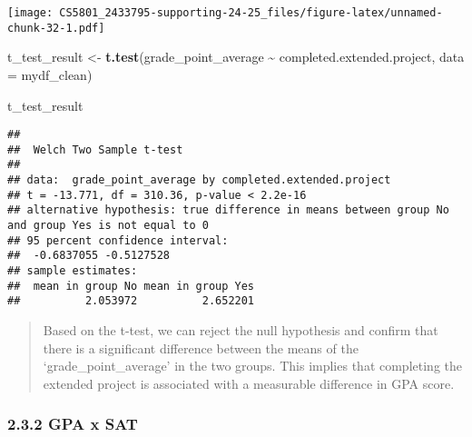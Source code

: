\documentclass[
]{article}
\newenvironment{Shaded}{\begin{snugshade}}{\end{snugshade}}
\newcommand{\AttributeTok}[1]{\textcolor[rgb]{0.13,0.29,0.53}{#1}}
\newcommand{\CommentTok}[1]{\textcolor[rgb]{0.56,0.35,0.01}{\textit{#1}}}
\newcommand{\DecValTok}[1]{\textcolor[rgb]{0.00,0.00,0.81}{#1}}
\newcommand{\FunctionTok}[1]{\textcolor[rgb]{0.13,0.29,0.53}{\textbf{#1}}}
\newcommand{\NormalTok}[1]{#1}
\newcommand{\OtherTok}[1]{\textcolor[rgb]{0.56,0.35,0.01}{#1}}
\newcommand{\SpecialCharTok}[1]{\textcolor[rgb]{0.81,0.36,0.00}{\textbf{#1}}}
\newcommand{\StringTok}[1]{\textcolor[rgb]{0.31,0.60,0.02}{#1}}
\begin{document}
\texttt{[image: CS5801\_2433795-supporting-24-25\_files/figure-latex/unnamed-chunk-32-1.pdf]}

\begin{Shaded}
\begin{Highlighting}[]
\NormalTok{t\_test\_result }\OtherTok{\textless{}{-}} \FunctionTok{t.test}\NormalTok{(grade\_point\_average }\SpecialCharTok{\textasciitilde{}}\NormalTok{ completed.extended.project, }\AttributeTok{data =}\NormalTok{ mydf\_clean)}

\NormalTok{t\_test\_result}
\end{Highlighting}
\end{Shaded}

\begin{verbatim}
## 
##  Welch Two Sample t-test
## 
## data:  grade_point_average by completed.extended.project
## t = -13.771, df = 310.36, p-value < 2.2e-16
## alternative hypothesis: true difference in means between group No and group Yes is not equal to 0
## 95 percent confidence interval:
##  -0.6837055 -0.5127528
## sample estimates:
##  mean in group No mean in group Yes 
##          2.053972          2.652201
\end{verbatim}

\begin{quote}
Based on the t-test, we can reject the null hypothesis and confirm that
there is a significant difference between the means of the
`grade\_point\_average' in the two groups. This implies that completing
the extended project is associated with a measurable difference in GPA
score.
\end{quote}

\subsubsection{2.3.2 GPA x SAT}\label{gpa-x-sat}

\begin{Shaded}
\end{Shaded}
\end{document}
